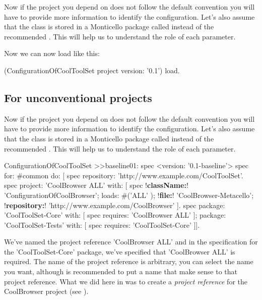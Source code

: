 \documentclass[a4paper,10pt,twoside]{book}
\begin{document}
Now if the project you depend on does not follow the default convention you will have to provide more information to identify the configuration. Let's also assume  that the class  is stored in a Monticello package called  instead of the recommended . This will help us to understand the role of each parameter. 


Now we can now load  like this:

\begin{code}{}
(ConfigurationOfCoolToolSet project version: '0.1') load.
\end{code}


\subsection{For unconventional projects}

Now if the project you depend on does not follow the default convention you will have to provide more information to identify
the configuration. Let's also assume  that the class  is stored in a Monticello package called  instead of the recommended . This will help us to understand the role of each parameter. 


\begin{code}{}
ConfigurationOfCoolToolSet >>baseline01: spec 
       <version: '0.1-baseline'>
       spec for: #common do: [
              spec repository: 'http://www.example.com/CoolToolSet'.
              spec project: 'CoolBrowser ALL' with: [
                            spec 
                                   !\textbf{className:}! 'ConfigurationOfCoolBrowser';
                                   loads: #('ALL' );
                                   !\textbf{file:}! 'CoolBrowser-Metacello';
                                   !\textbf{repository:}! 'http://www.example.com/CoolBrowser' ].
              spec 
                     package: 'CoolToolSet-Core' with: [ spec requires: 'CoolBrowser ALL' ];
                     package: 'CoolToolSet-Tests' with: [ spec requires: 'CoolToolSet-Core' ]].
\end{code}       


We've named the project reference 'CoolBrowser ALL' and in the specification for the 'CoolToolSet-Core' package, we've specified that 'CoolBrowser ALL' is required. The name of the project reference is arbitrary, you can select the name you want, although is recommended to put a name that make sense to that project reference. What we did here in  was to create a \emph{project reference} for the CoolBrowser project (see ). 
\end{document}
